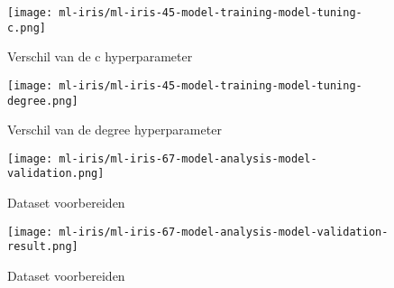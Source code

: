 \begin{figure}[hbt!]
  \centering
  \begin{minipage}{.5\textwidth}
      \centering
      \texttt{[image: ml-iris/ml-iris-45-model-training-model-tuning-c.png]}
      \caption{Verschil van de c hyperparameter}
      \label{fig:appendix:ml-iris-45-model-training-model-tuning-c}
  \end{minipage}\hfill
  \begin{minipage}{.5\textwidth}
      \centering
      \texttt{[image: ml-iris/ml-iris-45-model-training-model-tuning-degree.png]}
      \caption{Verschil van de degree hyperparameter}
      \label{fig:appendix:ml-iris-45-model-training-model-tuning-degree}
  \end{minipage}
\end{figure}

\clearpage

\begin{figure}[hbt!]
  \centering
  \texttt{[image: ml-iris/ml-iris-67-model-analysis-model-validation.png]}
  \caption{Dataset voorbereiden}
  \label{fig:appendix:ml-iris-67-model-analysis-model-validation}
\end{figure}

\begin{figure}[hbt!]
  \centering
  \texttt{[image: ml-iris/ml-iris-67-model-analysis-model-validation-result.png]}
  \caption{Dataset voorbereiden}
  \label{fig:appendix:ml-iris-67-model-analysis-model-validation-result}
\end{figure}

\newpage
